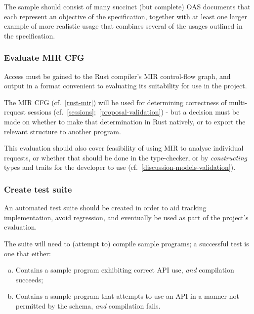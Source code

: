 The sample should consist of many succinct (but complete) OAS documents that each represent an objective of the specification, together with at least one larger example of more realistic usage that combines several of the usages outlined in the specification.

\subsubsection{Evaluate MIR CFG}\label{task-eval-mir-cfg}
Access must be gained to the Rust compiler's MIR control-flow graph, and output in a format convenient to evaluating its suitability for use in the project.
\begin{task}
\end{task}

The MIR CFG (cf.~\ref{rust-mir}) will be used for determining correctness of multi-request sessions (cf.~\ref{sessions};~\ref{proposal-validation}) - but a decision must be made on whether to make that determination in Rust natively, or to export the relevant structure to another program.

This evaluation should also cover feasibility of using MIR to analyse individual requests, or whether that should be done in the type-checker, or by \emph{constructing} types and traits for the developer to use (cf.~\ref{discussion-models-validation}).

\subsubsection{Create test suite}\label{task-create-test-suite}
An automated test suite should be created in order to aid tracking implementation, avoid regression, and eventually be used as part of the project's evaluation.
\begin{task}
\end{task}

The suite will need to (attempt to) compile sample programs; a successful test is one that either:
\begin{enumerate}[(a)]
	\item Contains a sample program exhibiting correct API use, \emph{and} compilation succeeds;
	\item Contains a sample program that attempts to use an API in a manner not permitted by the schema, \emph{and} compilation fails.
\end{enumerate}

